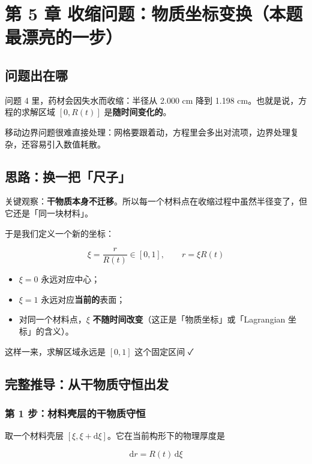 \section{第 5 章 收缩问题：物质坐标变换（本题最漂亮的一步）}


\subsection{问题出在哪}


问题 4 里，药材会因失水而收缩：半径从 2.000 cm 降到 1.198 cm。也就是说，方程的求解区域 $[0,R(t)]$ 是\textbf{随时间变化的}。


移动边界问题很难直接处理：网格要跟着动，方程里会多出对流项，边界处理复杂，还容易引入数值耗散。


\subsection{思路：换一把「尺子」}


关键观察：\textbf{干物质本身不迁移}。所以每一个材料点在收缩过程中虽然半径变了，但它还是「同一块材料」。


于是我们定义一个新的坐标：


\begin{equation}
\xi=\frac{r}{R(t)}\in[0,1],\qquad r=\xi R(t)\tag{5.1}
\end{equation}


\begin{itemize}
\item $\xi=0$ 永远对应中心；
\item $\xi=1$ 永远对应\textbf{当前的}表面；
\item 对同一个材料点，$\xi$ \textbf{不随时间改变}（这正是「物质坐标」或「Lagrangian 坐标」的含义）。
\end{itemize}


这样一来，求解区域永远是 $[0,1]$ 这个固定区间 ✓


\subsection{完整推导：从干物质守恒出发}


\subsubsection{第 1 步：材料壳层的干物质守恒}


取一个材料壳层 $[\xi,\xi+\mathrm{d}\xi]$。它在当前构形下的物理厚度是


\begin{equation*}
\mathrm{d} r=R(t)\,\mathrm{d}\xi
\end{equation*}



